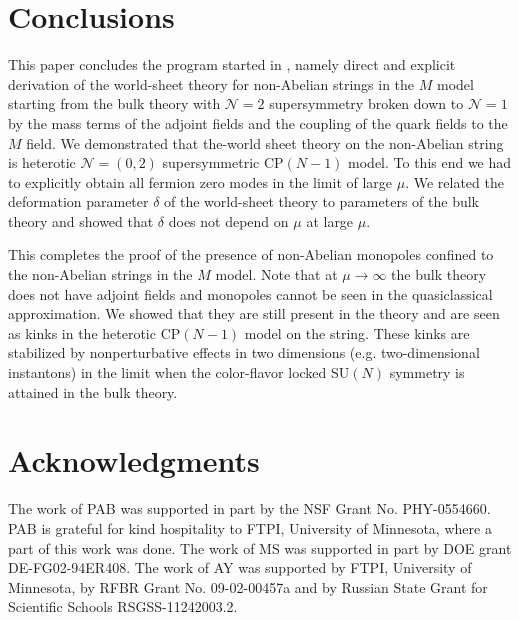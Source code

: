 \documentclass[12pt]{article}
\newcommand{\ntwo}{${\mathcal N}=2$ }
\newcommand{\ntwoo}{${\mathcal N}= \left(0,2\right) $ }
\newcommand{\none}{${\mathcal N}=1$ }
\begin{document}
\section{Conclusions}
\setcounter{equation}{0}

This paper concludes the program started in \cite{GSYmmodel},
namely direct and explicit derivation of the world-sheet theory  for non-Abelian strings in
the  $M$ model
starting from the bulk theory with \ntwo supersymmetry broken down to \none
by the mass terms of the adjoint fields and the coupling of the quark fields to the $M$ field.
We demonstrated that the-world sheet
theory on the non-Abelian string is heterotic \ntwoo supersymmetric CP$(N-1)$ model.
To this end we had to explicitly obtain all fermion zero modes
 in the limit of  large $\mu $.
We related the  deformation parameter $\delta$ of the world-sheet theory
to parameters of the bulk theory and showed that $\delta$
does not depend on $\mu$ at large $\mu$.

This completes the proof of the presence of non-Abelian monopoles confined to the non-Abelian
strings in the $M$ model. Note that at  $\mu\to\infty$ the bulk theory does not have adjoint fields
and monopoles cannot be seen in the quasiclassical approximation. We showed that they are still
present in the theory and are seen as  kinks in the heterotic  CP$(N-1)$ model on the string. These kinks
are stabilized by nonperturbative effects in two dimensions (e.g. two-dimensional instantons) in the limit
when the color-flavor locked SU$(N)$ symmetry is attained in the bulk theory.







\section*{Acknowledgments}

The work of PAB was supported in part by the NSF Grant No. PHY-0554660. PAB is grateful for kind
hospitality to FTPI, University of Minnesota, where a part of this work was done. 
The work of MS was supported in part by DOE grant DE-FG02-94ER408. 
The work of AY was  supported 
by  FTPI, University of Minnesota, 
by RFBR Grant No. 09-02-00457a 
and by Russian State Grant for 
Scientific Schools RSGSS-11242003.2.
\end{document}
